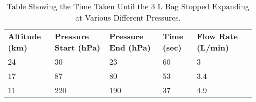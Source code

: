 \begin{table}[H]
\centering

\begin{tabular}{|l|l|l|l|l|l}
\cline{1-5}
\textbf{Altitude (km)} & \textbf{Pressure Start (hPa)} & \textbf{Pressure End (hPa)} & \textbf{Time (sec)} & \textbf{Flow Rate (L/min)} &  \\ \cline{1-5}
24 & 30 & 23 & 60 & 3 &  \\ \cline{1-5}
17 & 87 & 80 & 53 & 3.4 &  \\ \cline{1-5}
11 & 220 & 190 & 37 & 4.9 &  \\ \cline{1-5}
\end{tabular}
\caption{Table Showing the Time Taken Until the 3 L Bag Stopped Expanding at Various Different Pressures.}
\label{tab:pump-low-pressure-result}
\end{table}

\raggedbottom
